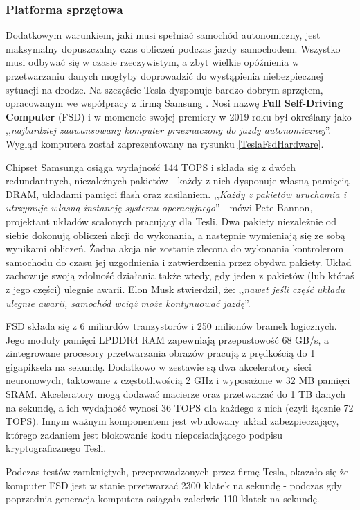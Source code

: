 \subsubsection{Platforma sprzętowa}
Dodatkowym warunkiem, jaki musi spełniać samochód autonomiczny, jest maksymalny dopuszczalny czas obliczeń podczas jazdy samochodem. Wszystko musi odbywać się w czasie rzeczywistym, a zbyt wielkie opóźnienia w przetwarzaniu danych mogłyby doprowadzić do wystąpienia niebezpiecznej sytuacji na drodze. Na szczęście Tesla dysponuje bardzo dobrym sprzętem, opracowanym we współpracy z firmą Samsung \cite{wiggers:teslaDrivingChip, autopilotReview:fsdComputer}. Nosi nazwę \textbf{Full Self-Driving Computer} (FSD) i w momencie swojej premiery w 2019 roku był określany jako ,,\textit{najbardziej zaawansowany komputer przeznaczony do jazdy autonomicznej}''. Wygląd komputera został zaprezentowany na rysunku \ref{TeslaFsdHardware}.

Chipset Samsunga osiąga wydajność 144 TOPS i składa się z dwóch redundantnych, niezależnych pakietów - każdy z nich dysponuje własną pamięcią DRAM, układami pamięci flash oraz zasilaniem. ,,\textit{Każdy z pakietów uruchamia i utrzymuje własną instancję systemu operacyjnego}'' - mówi Pete Bannon, projektant układów scalonych pracujący dla Tesli. Dwa pakiety niezależnie od siebie dokonują obliczeń akcji do wykonania, a następnie wymieniają się ze sobą wynikami obliczeń. Żadna akcja nie zostanie zlecona do wykonania kontrolerom samochodu do czasu jej uzgodnienia i zatwierdzenia przez obydwa pakiety. Układ zachowuje swoją zdolność działania także wtedy, gdy jeden z pakietów (lub któraś z jego części) ulegnie awarii. Elon Musk stwierdził, że: ,,\textit{nawet jeśli część układu ulegnie awarii, samochód wciąż może kontynuować jazdę}''.

FSD składa się z 6 miliardów tranzystorów i 250 milionów bramek logicznych. Jego moduły pamięci LPDDR4 RAM zapewniają przepustowość 68 GB/s, a zintegrowane procesory przetwarzania obrazów pracują z prędkością do 1 gigapiksela na sekundę. Dodatkowo w zestawie są dwa akceleratory sieci neuronowych, taktowane z częstotliwością 2 GHz i wyposażone w 32 MB pamięci SRAM. Akceleratory mogą dodawać macierze oraz przetwarzać do 1 TB danych na sekundę, a ich wydajność wynosi 36 TOPS dla każdego z nich (czyli łącznie 72 TOPS). Innym ważnym komponentem jest wbudowany układ zabezpieczający, którego zadaniem jest blokowanie kodu nieposiadającego podpisu kryptograficznego Tesli.

Podczas testów zamkniętych, przeprowadzonych przez firmę Tesla, okazało się że komputer FSD jest w stanie przetwarzać 2300 klatek na sekundę - podczas gdy poprzednia generacja komputera osiągała zaledwie 110 klatek na sekundę. \\

